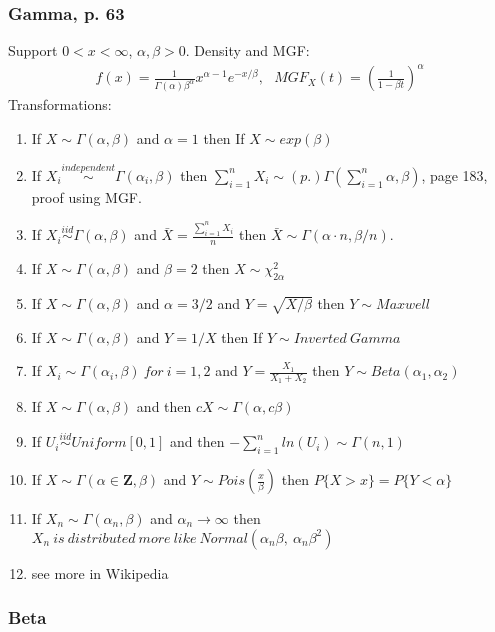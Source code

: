 \documentclass[]{article}
\begin{document}
\subsubsection{Gamma, p. 63}
Support $0<x<\infty$, $\alpha, \beta >0$. Density and MGF:
$$
\begin{aligned}
	f(x) = \frac{1}{\Gamma (\alpha) \beta^{\alpha}}x^{\alpha - 1} e^{-x/\beta}, ~~~ MGF_X(t) = \left(\frac{1}{1-\beta t} \right)^{\alpha}
\end{aligned}
$$
Transformations:
\begin{enumerate}[1)]
	\item If $X \sim \Gamma(\alpha, \beta)$ and $\alpha=1$ then If $X \sim exp(\beta)$
	\item If $X_i \overset{independent}{\sim} \Gamma(\alpha_i, \beta)$ then   $\sum_{i=1}^n X_i \sim (p.) \Gamma(\sum_{i=1}^n \alpha, \beta)$, page 183, proof using MGF.
	\item If $X_i \overset{iid}{\sim} \Gamma(\alpha, \beta)$ and $\bar{X} = \frac{\sum_{i=1}^n X_i}{n}$ then $\bar{X} \sim \Gamma(\alpha \cdot n, \beta/n)$.
	\item If $X \sim \Gamma(\alpha, \beta)$ and $\beta=2$ then $X \sim \chi^2_{2\alpha}$
	\item If $X \sim \Gamma(\alpha, \beta)$ and $\alpha=3/2$ and $Y=\sqrt{X/\beta}$ then $Y \sim Maxwell$
	\item If $X \sim \Gamma(\alpha, \beta)$ and $Y=1/X$ then If $Y \sim Inverted~Gamma$
	\item If $X_i \sim \Gamma(\alpha_i, \beta)~for~i=1,2$ and $Y=\frac{X_1}{X_1 + X_2}$ then $Y \sim Beta(\alpha_1, \alpha_2)$
	\item If $X \sim \Gamma(\alpha, \beta)$ and then $cX \sim  \Gamma(\alpha, c\beta)$
	\item If $U_i \overset{iid}{\sim} Uniform[0, 1]$ and then $-\sum_{i=1}^n ln(U_i)  \sim  \Gamma(n, 1)$
	\item If $X \sim \Gamma(\alpha \in \pmb{Z}, \beta)$ and $Y \sim Pois\left(\frac{x}{\beta}\right)$ then $P\{X > x\} = P\{Y < \alpha\}$
	\item If $X_n \sim \Gamma(\alpha_n, \beta)$ and $\alpha_n \rightarrow \infty$ then $X_n ~is~distributed~more~like~ Normal(\alpha_n\beta, ~\alpha_n \beta^2)$
	\item see more in Wikipedia
\end{enumerate}


\subsubsection{Beta}
\end{document}
